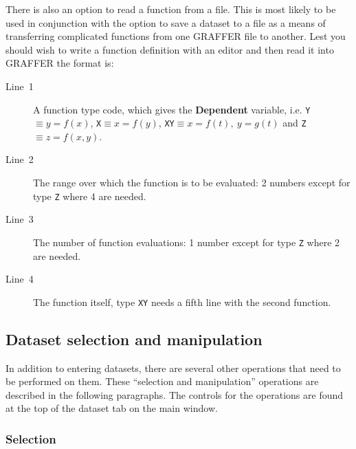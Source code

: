 \documentclass[11pt,twoside,english]{article}
\begin{document}
There is also an option to read a function from a file. This is most
likely to be used in conjunction with the option to save a dataset to a
file as a means of transferring complicated functions from one GRAFFER
file to another. Lest you should wish to write a function definition
with an editor and then read it into GRAFFER the format is:

\begin{description}
\item [Line~1]A function type code, which gives the \textbf{Dependent}
  variable, i.e. \texttt{Y}$\equiv y=f(x)$, \texttt{X$\equiv x=f(y)$},
  \texttt{XY$\equiv x=f(t),\: y=g(t)$} and \texttt{Z}$\equiv z=f(x,y)$.
\item [Line~2]The range over which the function is to be evaluated: 2
  numbers except for type \texttt{Z} where 4 are needed.
\item [Line~3]The number of function evaluations: 1 number except for
  type \texttt{Z} where 2 are needed.
\item [Line~4]The function itself, type \texttt{XY} needs a fifth line
  with the second function.
\end{description}

\subsection{Dataset selection and manipulation}

In addition to entering datasets, there are several other operations
that need to be performed on them. These {}``selection and
manipulation'' operations are described in the following
paragraphs. The controls for the operations are found at the top of the
\textsf{dataset} tab on the main window.


\subsubsection{Selection}
\end{document}
